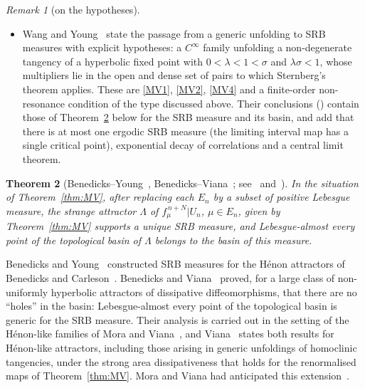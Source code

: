 \documentclass[11pt]{amsart}
\newtheorem{thm}{Theorem}[section]
\theoremstyle{definition}
\theoremstyle{remark}
\newtheorem{remark}[thm]{Remark}
\begin{document}
\begin{remark}[on the hypotheses]
\begin{itemize}[leftmargin=*]
alternative approach~\cite{Ber19}. Under~\ref{MV3} this assumption holds automatically. In linearising coordinates the return maps near the tangency are $T_1\circ L_\mu^n$ with $L_\mu$
linear, so their Jacobian is $(\lambda\sigma)^n\det DT_1$, where $\det DT_1$ is a fixed smooth function that does
not vanish; after rescaling it is evaluated on a neighbourhood of the tangency point that shrinks
exponentially, so the relative variation of the Jacobian tends to $0$. Berger's version of the Palis--Takens
renormalisation theorem~\cite[Theorem~1.4 and Remark~1.2]{BerNF}, whose proof uses only $C^r$ linearising
coordinates, makes this precise: for every $\delta>0$ and $n$ large, the renormalised family has the form
$(x,y)\mapsto(x^2+a+y,\,-bx)+(A_a,\,b\,B_a)(x,y)$ with $A$ and $B$ $\delta$-small in $C^r$, and its determinant lies
in $[(1-3\delta)b,(1+3\delta)b]$.
\item Wang and Young~\cite[Theorem~9]{WY01} state the passage from a generic unfolding to SRB measures with
explicit hypotheses: a $C^\infty$ family unfolding a non-degenerate tangency of a hyperbolic fixed point with
$0<\lambda<1<\sigma$ and $\lambda\sigma<1$, whose multipliers lie in the open and dense set of pairs to which
Sternberg's theorem applies. These are \ref{MV1}, \ref{MV2}, \ref{MV4} and a finite-order non-resonance
condition of the type discussed above. Their conclusions (\cite[Theorems~1--7]{WY01}) contain those of
Theorem~\ref{thm:BV} below for the SRB measure and its basin, and add that there is at most one ergodic SRB
measure (the limiting interval map has a single critical point), exponential decay of correlations and a
central limit theorem.
\end{itemize}
\end{remark}

\begin{thm}[Benedicks--Young~\cite{BY93}, Benedicks--Viana~\cite{BV01}; see~{\cite[\S4, Theorems~3 and~4]{Viana98}} and~{\cite[Theorems~3 and~9]{WY01}}]\label{thm:BV}
In the situation of Theorem~\ref{thm:MV}, after replacing each $E_n$ by a subset of positive Lebesgue
measure, the strange attractor $\Lambda$ of $f_\mu^{\,n+N}|U_n$, $\mu\in E_n$, given by Theorem~\ref{thm:MV} supports a unique SRB measure, and
Lebesgue-almost every point of the topological basin of $\Lambda$ belongs to the basin of this measure.
\end{thm}

Benedicks and Young~\cite{BY93} constructed SRB measures for the H\'enon attractors of Benedicks and
Carleson~\cite{BC91}. Benedicks and Viana~\cite{BV01} proved, for a large class of non-uniformly hyperbolic
attractors of dissipative diffeomorphisms, that there are no ``holes'' in the basin: Lebesgue-almost every
point of the topological basin is generic for the SRB measure. Their analysis is carried out in the
setting of the H\'enon-like families of Mora and Viana~\cite[\S3]{Ben02}, and Viana~\cite[\S4]{Viana98}
states both results for H\'enon-like attractors, including those arising in generic unfoldings of
homoclinic tangencies, under the strong area dissipativeness that holds for the renormalised maps of
Theorem~\ref{thm:MV}. Mora and Viana had anticipated this extension~\cite[p.~3]{MV93}.
\end{document}
